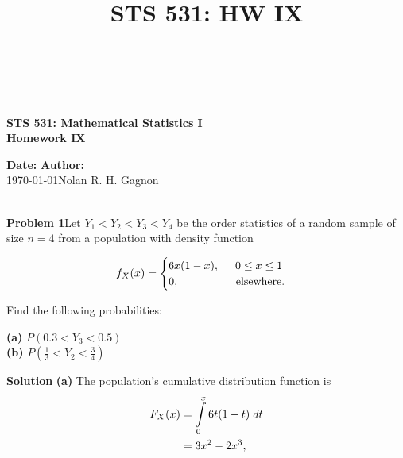 \documentclass{article}
\title{STS 531: HW IX}
\newcommand{\mybox}{%
    \collectbox{%
        \setlength{\fboxsep}{1pt}%
        \fbox{\BOXCONTENT}%
    }%
}
\begin{document}
\begin{center}
\hrulefill \\
\vspace{-0.7cm}
\hrulefill \\
\vspace{-0.3cm}

\begin{Large}
\textbf{STS 531:  Mathematical Statistics I} \\
\textbf{Homework IX} \\
\end{Large}
\begin{large}
\end{large}
\vspace{-7mm}
\noindent \textbf{Date:} \hfill \textbf{Author:}\\
\noindent\today \hfill Nolan R. H. Gagnon \\

\vspace{-0.4cm}
\hrulefill \\
\vspace{-0.7cm}
\hrulefill
\end{center}

\vspace{7mm}

\noindent\mybox{\textbf{Problem 1}}\hspace{3mm}Let $Y_1<Y_2<Y_3<Y_4$ be the order statistics of a random sample of size $n = 4$ from a population with density function 

$$
f_X(x) = \begin{cases} 6x(1-x), \hspace{5mm} 0\leq x \leq 1 \\
0, \hspace{18mm} \text{elsewhere.}
\end{cases}
$$

\noindent Find the following probabilities: 
\vspace{-0.3cm}
\begin{flushleft}
\textbf{(a)}  $P\left(0.3 < Y_3 < 0.5\right)$ \\
\textbf{(b)}  $P\left(\frac{1}{3} < Y_2 < \frac{3}{4}\right)$
\end{flushleft}

\vspace{5mm}

\noindent\mybox{\textbf{Solution}}\hspace{3mm} \textbf{(a)} The population's cumulative distribution function is 
\begin{align}
F_X(x) &= \int\limits_0^x6t(1-t) \hspace{1mm} dt \\
&= 3x^2 - 2x^3,
\end{align}
\end{document}
